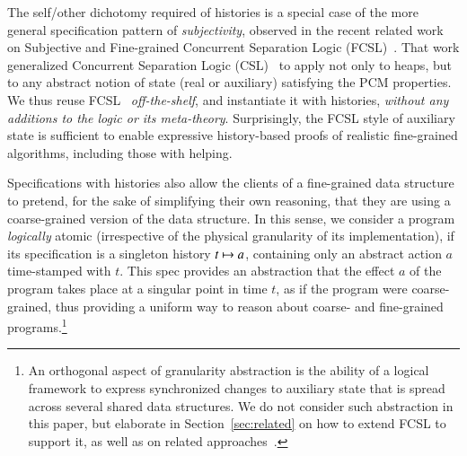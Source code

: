 The self/other dichotomy required of histories is a special case of
the more general specification pattern of \emph{subjectivity},
observed in the recent related work on Subjective and Fine-grained
Concurrent Separation Logic
(FCSL)~\cite{LeyWild-Nanevski:POPL13,Nanevski-al:ESOP14}. That work
generalized Concurrent Separation Logic (CSL)~\cite{OHearn:TCS07}
to apply not only to heaps, but to any abstract notion of state (real
or auxiliary) satisfying the PCM properties.
%
We thus reuse FCSL~\cite{Nanevski-al:ESOP14} \emph{off-the-shelf}, and
instantiate it with histories, \emph{without any additions to the
  logic or its meta-theory}. Surprisingly, the FCSL style of auxiliary
state is sufficient to enable expressive history-based proofs of
realistic fine-grained algorithms, including those with helping.


Specifications with histories also allow the clients of a fine-grained
data structure to pretend, for the sake of simplifying their own
reasoning, that they are using a coarse-grained version of the data
structure.
%
%
In this sense, we consider a program \emph{logically} atomic
(irrespective of the physical granularity of its implementation), if
its specification is a singleton history $t \mapsto a$, containing only
an abstract action $a$ time-stamped with $t$. This spec provides an
abstraction that the effect $a$ of the program takes place at a
singular point in time $t$, as if the program were coarse-grained,
thus providing a uniform way to reason about coarse- and fine-grained
programs.\footnote{An orthogonal aspect of granularity abstraction is
  the ability of a logical framework to express synchronized changes
  to auxiliary state that is spread across several shared data
  structures. We do not consider such abstraction in this paper, but
  elaborate in Section~\ref{sec:related} on how to extend FCSL to
  support it, as well as on related
  approaches~\cite{Svendsen-Birkedal:ESOP14,Svendsen-al:ESOP13,ArrozPincho-al:ECOOP14,Jacobs-Piessens:POPL11}.}
%
%


